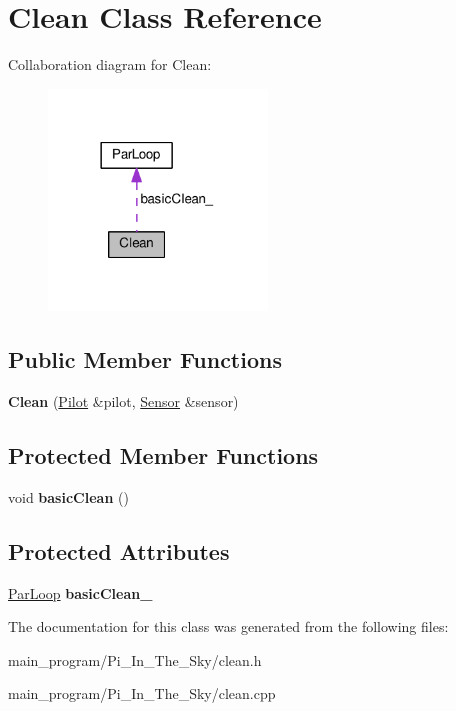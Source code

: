 \hypertarget{class_clean}{}\section{Clean Class Reference}
\label{class_clean}


Collaboration diagram for Clean\+:\nopagebreak
\begin{figure}[H]
\begin{center}
\leavevmode
\includegraphics[width=165pt]{class_clean__coll__graph}
\end{center}
\end{figure}
\subsection*{Public Member Functions}
\begin{DoxyCompactItemize}
\item 
{\bfseries Clean} (\hyperlink{class_pilot}{Pilot} \&pilot, \hyperlink{class_sensor}{Sensor} \&sensor)\hypertarget{class_clean_aae88101ce31af78d9af25405d281bf8a}{}\label{class_clean_aae88101ce31af78d9af25405d281bf8a}

\end{DoxyCompactItemize}
\subsection*{Protected Member Functions}
\begin{DoxyCompactItemize}
\item 
void {\bfseries basic\+Clean} ()\hypertarget{class_clean_a903925ff3d36c13e2bf4d004645055bd}{}\label{class_clean_a903925ff3d36c13e2bf4d004645055bd}

\end{DoxyCompactItemize}
\subsection*{Protected Attributes}
\begin{DoxyCompactItemize}
\item 
\hyperlink{class_par_loop}{Par\+Loop} {\bfseries basic\+Clean\+\_\+}\hypertarget{class_clean_ace2cc08f6555b450d4941d9f05cc337b}{}\label{class_clean_ace2cc08f6555b450d4941d9f05cc337b}

\end{DoxyCompactItemize}


The documentation for this class was generated from the following files\+:\begin{DoxyCompactItemize}
\item 
main\+\_\+program/\+Pi\+\_\+\+In\+\_\+\+The\+\_\+\+Sky/clean.\+h\item 
main\+\_\+program/\+Pi\+\_\+\+In\+\_\+\+The\+\_\+\+Sky/clean.\+cpp\end{DoxyCompactItemize}
